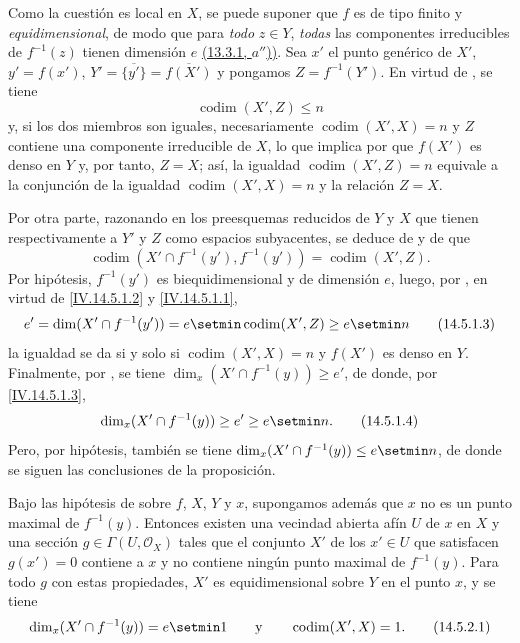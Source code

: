 Como la cuestión es local en $X$, se puede suponer que $f$ es de tipo finito y \emph{equidimensional}, de modo que para \emph{todo} $z\in Y$, \emph{todas} las componentes irreducibles de $f^{-1}(z)$ tienen dimensión $e$ {\hyperlink{ega4.c04.prop.13-3-1}{(13.3.1, $a''$))}}.
Sea $x'$ el punto genérico de $X'$, $y'=f(x')$, $Y'=\overline{\{y'\}}=\overline{f(X')}$ y pongamos $Z=f^{-1}(Y')$.
En virtud de , se tiene
\begin{equation}
  \operatorname{codim}(X',Z)\leq n
  \tag{14.5.1.1}\label{IV.14.5.1.1-fr}
\end{equation}
 y, si los dos miembros son iguales, necesariamente $\operatorname{codim}(X',X)=n$ y $Z$ contiene una componente irreducible de $X$, lo que implica por  que $f(X')$ es denso en $Y$ y, por tanto, $Z=X$; así, la igualdad $\operatorname{codim}(X',Z)=n$ equivale a la conjunción de la igualdad $\operatorname{codim}(X',X)=n$ y la relación $Z=X$.

Por otra parte, razonando en los preesquemas reducidos de $Y$ y $X$ que tienen respectivamente a $Y'$ y $Z$ como espacios subyacentes, se deduce de  y de  que
\begin{equation}
  \operatorname{codim}(X'\cap f^{-1}(y'),f^{-1}(y'))=\operatorname{codim}(X',Z).
  \tag{14.5.1.2}\label{IV.14.5.1.2-fr}
\end{equation}
Por hipótesis, $f^{-1}(y')$ es biequidimensional  y de dimensión $e$, luego, por , en virtud de \eqref{IV.14.5.1.2} y \eqref{IV.14.5.1.1},
\begin{equation}
  e'=\dim(X'\cap f^{-1}(y'))=e\setmin\operatorname{codim}(X',Z)\geq e\setmin n
  \tag{14.5.1.3}\label{IV.14.5.1.3-fr}
\end{equation}
la igualdad se da si y solo si $\operatorname{codim}(X',X)=n$ y $f(X')$ es denso en $Y$.
Finalmente, por , se tiene $\dim_x(X'\cap f^{-1}(y))\geq e'$, de donde, por \eqref{IV.14.5.1.3},
\begin{equation}
  \dim_x(X'\cap f^{-1}(y))\geq e'\geq e\setmin n.
  \tag{14.5.1.4}\label{IV.14.5.1.4-fr}
\end{equation}
Pero, por hipótesis, también se tiene $\dim_x(X'\cap f^{-1}(y))\leq e\setmin n$, de donde se siguen las conclusiones de la proposición.

\begin{corollary}[14.5.2]
\label{IV.14.5.2}
Bajo las hipótesis de  sobre $f$, $X$, $Y$ y $x$, supongamos además que $x$ no es un punto maximal de $f^{-1}(y)$.
Entonces existen una vecindad abierta afín $U$ de $x$ en $X$ y una sección $g\in\Gamma(U,\mathcal O_X)$ tales que el conjunto $X'$ de los $x'\in U$ que satisfacen $g(x')=0$ contiene a $x$ y no contiene ningún punto maximal de $f^{-1}(y)$.
Para todo $g$ con estas propiedades, $X'$ es equidimensional sobre $Y$ en el punto $x$, y se tiene
\begin{equation}
  \dim_x(X'\cap f^{-1}(y))=e\setmin 1 \qquad\text{y}\qquad \operatorname{codim}(X',X)=1.
  \tag{14.5.2.1}\label{IV.14.5.2.1-fr}
\end{equation}
\end{corollary}

